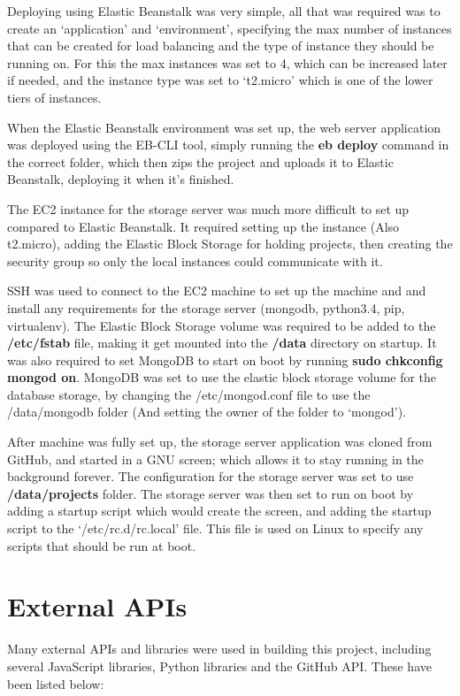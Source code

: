 Deploying using Elastic Beanstalk was very simple, all that was required was to create an `application' and `environment', specifying the max number of instances that can be created for load balancing and the type of instance they should be running on. For this the max instances was set to 4, which can be increased later if needed, and the instance type was set to `t2.micro' which is one of the lower tiers of instances.

When the Elastic Beanstalk environment was set up, the web server application was deployed using the EB-CLI tool, simply running the \textbf{eb deploy} command in the correct folder, which then zips the project and uploads it to Elastic Beanstalk, deploying it when it's finished.

The EC2 instance for the storage server was much more difficult to set up compared to Elastic Beanstalk. It required setting up the instance (Also t2.micro), adding the Elastic Block Storage for holding projects, then creating the security group so only the local instances could communicate with it.

SSH was used to connect to the EC2 machine to set up the machine and and install any requirements for the storage server (mongodb, python3.4, pip, virtualenv). The Elastic Block Storage volume was required to be added to the \textbf{/etc/fstab} file, making it get mounted into the \textbf{/data} directory on startup. It was also required to set MongoDB to start on boot by running \textbf{sudo chkconfig mongod on}. MongoDB was set to use the elastic block storage volume for the database storage, by changing the /etc/mongod.conf file to use the /data/mongodb folder (And setting the owner of the folder to `mongod').

After machine was fully set up, the storage server application was cloned from GitHub, and started in a GNU screen; which allows it to stay running in the background forever. The configuration for the storage server was set to use \textbf{/data/projects} folder. The storage server was then set to run on boot by adding a startup script which would create the screen, and adding the startup script to the `/etc/rc.d/rc.local' file. This file is used on Linux to specify any scripts that should be run at boot.

\section{External APIs}
Many external APIs and libraries were used in building this project, including several JavaScript libraries, Python libraries and the GitHub API. These have been listed below:


